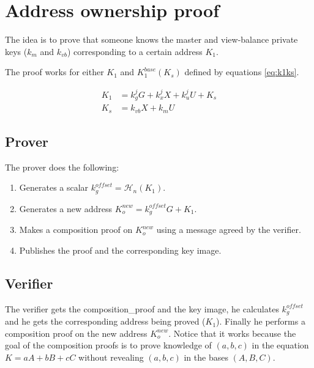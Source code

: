 \documentclass[usletter,11pt,english,oneside,onecolumn,final,openany]{report}
\begin{document}

\section{Address ownership proof}

The idea is to prove that someone knows the master and view-balance private keys ($k_m$ and $k_{vb}$) corresponding to a certain address $K_1$.

The proof works for either $K_1$ and $K_{1}^{base} (K_s)$ defined by equations \ref{eq:k1ks}.

\begin{align}
    \label{eq:k1ks}
    K_1 &= k^j_g G + k^j_x X + k^j_u U + K_s \\
    K_s &= k_{vb} X + k_m U
\end{align}


\subsection{Prover}

The prover does the following:

\begin{enumerate}
    \item Generates a scalar $k_g^{offset} = \mathcal{H}_{n}(K_1)$.
    \item Generates a new address $K_o^{new} = k_g^{offset} G + K_1$.
    \item Makes a composition proof on $K_o^{new}$ using a message agreed by the verifier.
    \item Publishes the proof and the corresponding key image.
\end{enumerate}
	
\subsection{Verifier}

The verifier gets the composition\_proof and the key image, he calculates $k_g^{offset}$ and he gets the corresponding address being proved ($K_1$). Finally he performs a composition proof on the new address $K_o^{new}$. Notice that it works because the goal of the composition proofs is to prove knowledge of $(a,b,c)$ in the equation $K = a A + b B + c C$ without revealing $(a,b,c)$ in the bases $(A,B,C)$.

\end{document}
